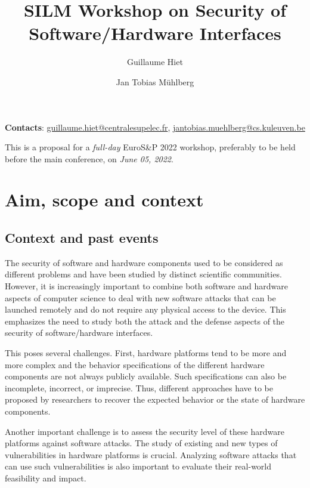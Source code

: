 \documentclass[a4paper,11pt]{article} %
\title{\vspace{-0.5cm}SILM Workshop on Security of Software/Hardware Interfaces}
\date{}
\author{Guillaume Hiet}
\affil{CIDRE team, CentraleSupélec/Inria, IRISA, France}
\author{Jan Tobias M\"uhlberg}
\affil{imec-DistriNet, KU Leuven, Belgium}
\numberwithin{equation}{section} %
\numberwithin{figure}{section} %
\numberwithin{table}{section} %
\begin{document}
\maketitle %




\begin{center}
 \textbf{Contacts}:  \url{guillaume.hiet@centralesupelec.fr},
\url{jantobias.muehlberg@cs.kuleuven.be}
\end{center}

\noindent This is a proposal for a \emph{full-day} EuroS\&P 2022 workshop,
preferably to be held before the main conference, on \emph{June 05,
2022}.

\section{Aim, scope and context}
\subsection{Context and past events}

The security of software and hardware components used to be considered as
different problems and have been studied by distinct scientific
communities. However, it is increasingly important to combine both software
and hardware aspects of computer science to deal with new software attacks
that can be launched remotely and do not require any physical access to the
device. This emphasizes the need to study both the attack and the defense
aspects of the security of software/hardware interfaces.

This poses several challenges. First, hardware platforms tend to be more
and more complex and the behavior specifications of the different hardware
components are not always publicly available. Such specifications can also
be incomplete, incorrect, or imprecise. Thus, different approaches have to
be proposed by researchers to recover the expected behavior or the state of
hardware components.

Another important challenge is to assess the security level of these
hardware platforms against software attacks. The study of existing and new
types of vulnerabilities in hardware platforms is crucial. Analyzing 
software attacks that can use such vulnerabilities is also important to
evaluate their real-world feasibility and impact.
\end{document}
